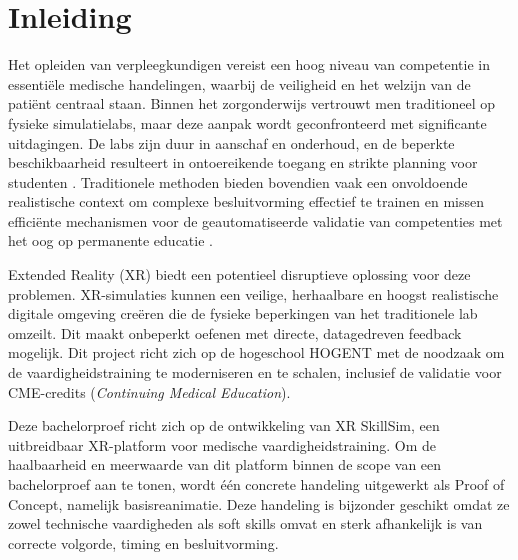 


% 

\section{Inleiding}%
\label{sec:inleiding}

Het opleiden van verpleegkundigen vereist een hoog niveau van competentie in essentiële medische handelingen, waarbij de veiligheid en het welzijn van de patiënt centraal staan. Binnen het zorgonderwijs vertrouwt men traditioneel op fysieke simulatielabs, maar deze aanpak wordt geconfronteerd met significante uitdagingen. De labs zijn duur in aanschaf en onderhoud, en de beperkte beschikbaarheid resulteert in ontoereikende toegang en strikte planning voor studenten \autocite{Pottle2019}. Traditionele methoden bieden bovendien vaak een onvoldoende realistische context om complexe besluitvorming effectief te trainen en missen efficiënte mechanismen voor de geautomatiseerde validatie van competenties met het oog op permanente educatie \autocite{Radianti2020}.

Extended Reality (XR) biedt een potentieel disruptieve oplossing voor deze problemen. XR-simulaties kunnen een veilige, herhaalbare en hoogst realistische digitale omgeving creëren die de fysieke beperkingen van het traditionele lab omzeilt. Dit maakt onbeperkt oefenen met directe, datagedreven feedback mogelijk. Dit project richt zich op de hogeschool HOGENT met de noodzaak om de vaardigheidstraining te moderniseren en te schalen, inclusief de validatie voor CME-credits (\textit{Continuing Medical Education}).

Deze bachelorproef richt zich op de ontwikkeling van XR SkillSim, een uitbreidbaar XR-platform voor medische vaardigheidstraining. Om de haalbaarheid en meerwaarde van dit platform binnen de scope van een bachelorproef aan te tonen, wordt één concrete handeling uitgewerkt als Proof of Concept, namelijk basisreanimatie. Deze handeling is bijzonder geschikt omdat ze zowel technische vaardigheden als soft skills omvat en sterk afhankelijk is van correcte volgorde, timing en besluitvorming.

